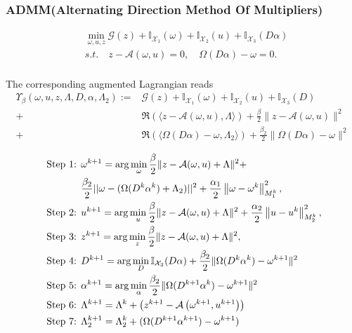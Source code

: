\documentclass[UTF8]{beamer}
\begin{document}
\begin{frame}[c]\frametitle{ADMM(Alternating Direction Method Of Multipliers)}
\begin{equation}
\begin{aligned}
&\min _{\omega, u, z} \mathcal{G}(z)+\mathbb{I}_{\mathcal{X}_{1}}(\omega)+\mathbb{I}_{\mathcal{X}_{2}}(u)
+ \mathbb{I}_{\mathcal{X}_{3}}(D\alpha) \\
&s.t. \quad z-\mathcal{A}(\omega, u)=0, \quad \Omega(D\alpha) - \omega = 0. \\
\end{aligned}
\end{equation}

The corresponding augmented Lagrangian reads
$$
\begin{aligned}
\Upsilon_{\beta}(\omega, u, z, \Lambda,D,\alpha,\Lambda_2):=&\mathcal{G}(z)+\mathbb{I}_{\mathcal{X}_{1}}(\omega)+\mathbb{I}_{\mathcal{X}_{2}}(u) + \mathbb{I}_{\mathcal{X}_{3}}(D)\\
+&\Re(\langle z-\mathcal{A}(\omega, u), \Lambda\rangle)+\frac{\beta}{2}\|z-\mathcal{A}(\omega, u)\|^{2}
\\
+&\Re(\langle \Omega(D\alpha) - \omega, \Lambda_2\rangle)+\frac{\beta_2}{2}\| \Omega(D\alpha) - \omega\|^{2}
\end{aligned}
$$
	
\end{frame}
\begin{frame}
\begin{align}
\text { Step 1: } & \omega^{k+1}=\arg \min _{\omega} \frac{\beta}{2}\|z-\mathcal{A}(\omega, u) + \Lambda \|^{2} +\\
&\frac{\beta_{2}}{2}||\omega - (\Omega(D^k\alpha^k) + \Lambda_2)||^2 + 
\frac{\alpha_{1}}{2}\left\|\omega-\omega^{k}\right\|_{M_{1}^{k}}^{2}, \notag \\
\text { Step 2: } & u^{k+1}=\arg \min _{u} \frac{\beta}{2}\|z-\mathcal{A}(\omega, u) + \Lambda \|^{2} +\frac{\alpha_{2}}{2}\left\|u-u^{k}\right\|_{M_{2}^{k}}^{2}, \notag \\ \text { Step 3: } & z^{k+1}=\arg \min _{z} \frac{\beta}{2}\|z-\mathcal{A}(\omega, u) + \Lambda \|^{2} , \notag \\
\text { Step 4: } & D^{k+1}=\arg \min _{D} \mathbb{I}_{\mathcal{X}_{3}}(D\alpha) +
\frac{\beta_2}{2}\| \Omega(D^k\alpha^k) - \omega^{k+1}\|^{2} \notag \\
\text { Step 5: } & \alpha^{k+1}=\arg \min _{\alpha}  \frac{\beta_2}{2}\| \Omega(D^{k+1}\alpha^k) - \omega^{k+1}\|^{2}\notag \\
\text { Step 6: } &
\Lambda^{k+1}=\Lambda^{k}+\left(z^{k+1}-\mathcal{A}\left(\omega^{k+1}, u^{k+1}\right)\right)  \label{Lup}\\
\text { Step 7: } & \Lambda_2^{k+1}=\Lambda_2^{k}+ (\Omega(D^{k+1}\alpha^{k+1}) - \omega^{k+1}) \label{L2up}
\end{align}
\end{frame}
\end{document}
